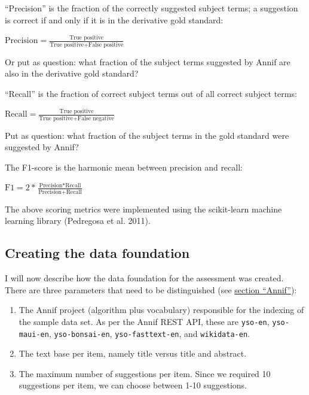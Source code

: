 ``Precision'' is the fraction of the correctly suggested subject terms;
a suggestion is correct if and only if it is in the derivative gold
standard:

\begin{center} 
$\text{Precision} = \displaystyle \frac{\text{True positive}}{\text{True positive} + \text{False positive}}$
\end{center}

Or put as question: what fraction of the subject terms suggested by
Annif are also in the derivative gold standard?

``Recall'' is the fraction of correct subject terms out of all correct
subject terms:

\begin{center} 
$\text{Recall} = \displaystyle \frac{\text{True positive}}{\text{True positive} + \text{False negative}}$
\end{center}

Put as question: what fraction of the subject terms in the gold standard
were suggested by Annif?

The F1-score is the harmonic mean between precision and recall:

\begin{center} 
$\text{F1} = \displaystyle 2 * \frac{\text{Precision} * \text{Recall}}{\text{Precision} + \text{Recall}}$
\end{center}

The above scoring metrics were implemented using the scikit-learn
machine learning library (Pedregosa et al. 2011).

\hypertarget{creating-the-data-foundation}{%
\subsection{Creating the data
foundation}\label{creating-the-data-foundation}}

I will now describe how the data foundation for the assessment was
created. There are three parameters that need to be distinguished (see
\protect\hyperlink{annif}{section ``Annif''}):

\begin{enumerate}
\def\labelenumi{\arabic{enumi}.}
\tightlist
\item
  The Annif project (algorithm plus vocabulary) responsible for the
  indexing of the sample data set. As per the Annif REST API, these are
  \texttt{yso-en}, \texttt{yso-maui-en}, \texttt{yso-bonsai-en},
  \texttt{yso-fasttext-en}, and \texttt{wikidata-en}.
\item
  The text base per item, namely title versus title and abstract.
\item
  The maximum number of suggestions per item. Since we required 10
  suggestions per item, we can choose between 1-10 suggestions.
\end{enumerate}

